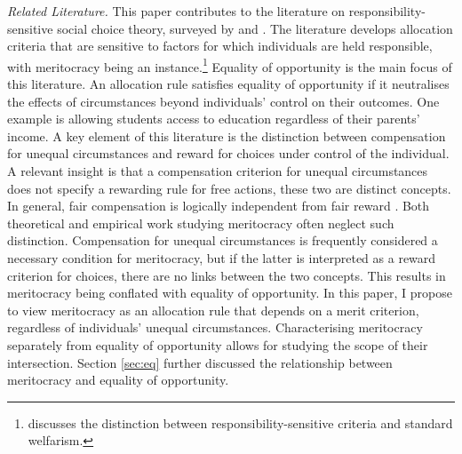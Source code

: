 \emph{Related Literature.} This paper contributes to the literature on responsibility-sensitive social choice theory, surveyed by \cite{fleurbaeyFairnessResponsibilityWelfare2008} and \cite{roemerEqualityOpportunityTheory2016}. The literature develops allocation criteria that are sensitive to factors for which individuals are held responsible, with meritocracy being an instance.\footnote{\cite{carrollEqualOpportunityDifferent2025} discusses the distinction between responsibility-sensitive criteria and standard welfarism.} Equality of opportunity is the main focus of this literature. An allocation rule satisfies equality of opportunity if it neutralises the effects of circumstances beyond individuals' control on their outcomes. One example is allowing students access to education regardless of their parents' income. A key element of this literature is the distinction between compensation for unequal circumstances and reward for choices under control of the individual. A relevant insight is that a compensation criterion for unequal circumstances does not specify a rewarding rule for free actions, these two are distinct concepts. In general, fair compensation is logically independent from fair reward \citep{moulinFairDivisionCollective2004}. Both theoretical and empirical work studying meritocracy often neglect such distinction. Compensation for unequal circumstances is frequently considered a necessary condition for meritocracy, but if the latter is interpreted as a reward criterion for choices, there are no links between the two concepts. This results in meritocracy being conflated with equality of opportunity. In this paper, I propose to view meritocracy as an allocation rule that depends on a merit criterion, regardless of individuals' unequal circumstances. Characterising meritocracy separately from equality of opportunity allows for studying the scope of their intersection. Section \ref{sec:eq} further discussed the relationship between meritocracy and equality of opportunity.


